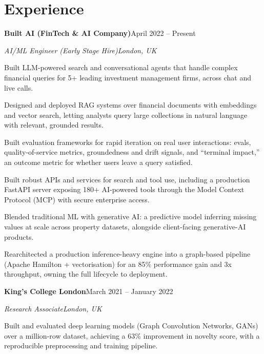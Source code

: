 \documentclass[10pt,a4paper]{article}
\newcommand{\entry}[4]{%
  {\color{company}\bfseries #1}\hfill {\color{muted}#2}\par
  \vspace{1pt}
  {\itshape #3}\hfill {\color{muted}\itshape #4}\par
  \vspace{3pt}%
}
\begin{document}
\section{Experience}
\entry{Built AI (FinTech \& AI Company)}{April 2022 -- Present}{AI/ML Engineer (Early Stage Hire)}{London, UK}
\begin{tight}
  \item Built LLM-powered search and conversational agents that handle complex financial queries for 5+ leading investment management firms, across chat and live calls.
  \item Designed and deployed RAG systems over financial documents with embeddings and vector search, letting analysts query large collections in natural language with relevant, grounded results.
  \item Built evaluation frameworks for rapid iteration on real user interactions: evals, quality-of-service metrics, groundedness and drift signals, and ``terminal impact,'' an outcome metric for whether users leave a query satisfied.
  \item Built robust APIs and services for search and tool use, including a production FastAPI server exposing 180+ AI-powered tools through the Model Context Protocol (MCP) with secure enterprise access.
  \item Blended traditional ML with generative AI: a predictive model inferring missing values at scale across property datasets, alongside client-facing generative-AI products.
  \item Rearchitected a production inference-heavy engine into a graph-based pipeline (Apache Hamilton + vectorisation) for an 85\% performance gain and 3x throughput, owning the full lifecycle to deployment.
\end{tight}

\entry{King's College London}{March 2021 -- January 2022}{Research Associate}{London, UK}
\begin{tight}
  \item Built and evaluated deep learning models (Graph Convolution Networks, GANs) over a million-row dataset, achieving a 63\% improvement in novelty score, with a reproducible preprocessing and training pipeline.
\end{tight}

\end{document}
